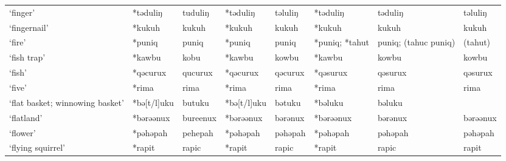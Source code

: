 \begin{landscape}
\begin{longtable}[c]{@{}p{3cm}<{\raggedright}p{2.75cm}<{\raggedright}p{2.75cm}<{\raggedright}p{2.75cm}<{\raggedright}p{2.75cm}<{\raggedright}p{2.75cm}<{\raggedright}p{2.75cm}<{\raggedright}p{2.75cm}<{\raggedright}@{}}
`finger'                                             & *təduliŋ     & tuduliŋ                       & *təduliŋ       & təluliŋ                    & *təduliŋ         & təduliŋ                  & təluliŋ                           \\
`fingernail'                                         & *kukuh       & kukuh                         & *kukuh         & kukuh                      & *kukuh           & kukuh                    & kukuh                             \\
`fire'                                               & *puniq       & puniq                         & *puniq         & puniq                      & *puniq; *tahut   & puniq; (tahuc puniq)     & (tahut)                           \\
`fish trap'                                          & *kawbu       & kobu                          & *kawbu         & kowbu                      & *kawbu           & kowbu                    & kowbu                             \\
`fish'                                               & *qəcurux     & qucurux                       & *qəcurux       & qəcurux                    & *qəsurux         & qəsurux                  & qəsurux                           \\
`five'                                               & *rima        & rima                          & *rima          & rima                       & *rima            & rima                     & rima                              \\
`flat basket; winnowing basket'                      & *bə[t/l]uku      & butuku                        & *bə[t/l]uku    & bətuku                     & *bəluku      & bəluku                   &                                   \\
`flatland'                                           & *bərəənux    & bureenux                      & *bərəənux      & bərənux                    & *bərəənux        & bərənux                  & bərəənux                          \\
`flower'                                             & *pəhəpah     & pehepah                       & *pəhəpah       & pəhəpah                    & *pəhəpah         & pəhəpah                  & pəhəpah                           \\
`flying squirrel'                                    & *rapit       & rapic                         & *rapit         & rapic                      & *rapit           & rapic                    & rapit                             \\

\end{longtable}
\end{landscape}
